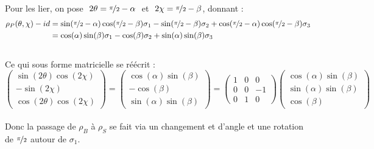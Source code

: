 Pour les lier, on pose $\ 2\theta = \nicefrac{\pi}{2} - \alpha\ $ et $\ 2\chi = \nicefrac{\pi}{2} - \beta$, donnant :
\begin{align*}
	\rho_P(\theta, \chi) - id 
	&= \sin(\nicefrac{\pi}{2} - \alpha) \cos(\nicefrac{\pi}{2} - \beta) \sigma_1 - \sin (\nicefrac{\pi}{2} - \beta) \sigma_2 + \cos(\nicefrac{\pi}{2} - \alpha) \cos(\nicefrac{\pi}{2} - \beta) \sigma_3 \\
	&= \cos(\alpha) \sin(\beta) \sigma_1 - \cos (\beta) \sigma_2 + \sin(\alpha) \sin(\beta) \sigma_3
\end{align*}
\\
Ce qui sous forme matricielle se réécrit :
\[\begin{pmatrix}
	\sin(2\theta) \cos(2\chi) \\ -\sin (2\chi) \\ \cos(2\theta) \cos(2\chi)
\end{pmatrix} = \begin{pmatrix}
	\cos(\alpha) \sin(\beta) \\ -\cos (\beta) \\ \sin(\alpha) \sin(\beta)
\end{pmatrix} = \begin{pmatrix}
	1 & 0 & 0 \\ 0 & 0 & -1 \\ 0 & 1 & 0
\end{pmatrix}\begin{pmatrix}
	\cos(\alpha) \sin(\beta) \\ \sin(\alpha) \sin(\beta) \\ \cos (\beta)
\end{pmatrix}\]
\\
Donc la passage de $\rho_B$ à $\rho_S$ se fait via un changement et d'angle et une rotation de $\nicefrac{\pi}{2}$ autour de $\sigma_1$.
\\

